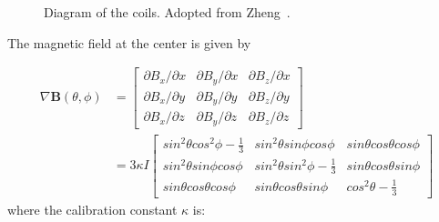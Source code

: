 \begin{figure}[t!]
	\centering
	\caption{{Diagram of the coils. Adopted from Zheng~\cite{YuanThesis}.}}
	\label{gradient_coils}
\end{figure}

The magnetic field at the center is given by\cite{PhysRevA.37.2877}

\begin{equation}\label{gradient}
\begin{split}
\nabla\boldsymbol{B}(\theta, \phi)
&=\begin{bmatrix}
\partial B_x/\partial x & \partial B_y/\partial x & \partial B_z/\partial x \\
\partial B_x/\partial y & \partial B_y/\partial y & \partial B_z/\partial y \\
\partial B_x/\partial z & \partial B_y/\partial z & \partial B_z/\partial z
\end{bmatrix}\\
&=3\kappa I
\begin{bmatrix}
sin^2\theta cos^2\phi-\frac{1}{3} & sin^2\theta sin\phi cos\phi & sin\theta cos\theta cos\phi \\
sin^2\theta sin\phi cos\phi & sin^2\theta sin^2\phi-\frac{1}{3} & sin\theta cos\theta sin\phi \\
sin\theta cos\theta cos\phi & sin\theta cos\theta sin\phi & cos^2\theta-\frac{1}{3}
\end{bmatrix}
\end{split}
\end{equation}
where the calibration constant $\kappa$ is:

